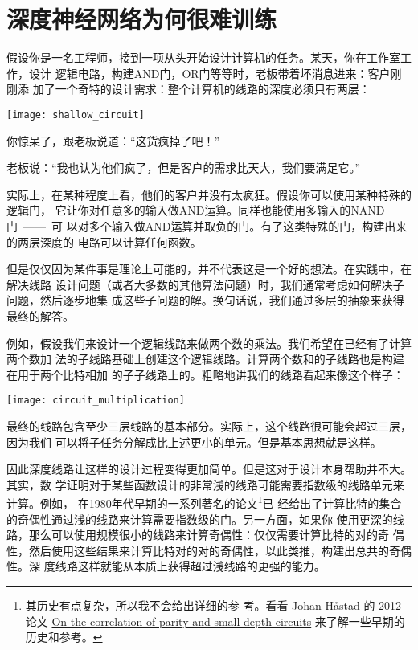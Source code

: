 
\chapter{深度神经网络为何很难训练}
\label{ch:WhyHardToTrain}

假设你是一名工程师，接到一项从头开始设计计算机的任务。某天，你在工作室工作，设计
逻辑电路，构建{\serif AND}门，{\serif OR}门等等时，老板带着坏消息进来：客户刚刚添
加了一个奇特的设计需求：整个计算机的线路的深度必须只有两层：
\begin{center}
  \texttt{[image: shallow\_circuit]}
\end{center}

你惊呆了，跟老板说道：“这货疯掉了吧！”
 
老板说：“我也认为他们疯了，但是客户的需求比天大，我们要满足它。”
 
实际上，在某种程度上看，他们的客户并没有太疯狂。假设你可以使用某种特殊的逻辑门，
它让你对任意多的输入做{\serif AND}运算。同样也能使用多输入的{\serif NAND}门~——~可
以对多个输入做{\serif AND}运算并取负的门。有了这类特殊的门，构建出来的两层深度的
电路可以计算任何函数。

但是仅仅因为某件事是理论上可能的，并不代表这是一个好的想法。在实践中，在解决线路
设计问题（或者大多数的其他算法问题）时，我们通常考虑如何解决子问题，然后逐步地集
成这些子问题的解。换句话说，我们通过多层的抽象来获得最终的解答。

例如，假设我们来设计一个逻辑线路来做两个数的乘法。我们希望在已经有了计算两个数加
法的子线路基础上创建这个逻辑线路。计算两个数和的子线路也是构建在用于两个比特相加
的子子线路上的。粗略地讲我们的线路看起来像这个样子：
\begin{center}
  \texttt{[image: circuit\_multiplication]}
\end{center}

最终的线路包含至少三层线路的基本部分。实际上，这个线路很可能会超过三层，因为我们
可以将子任务分解成比上述更小的单元。但是基本思想就是这样。
 
因此深度线路让这样的设计过程变得更加简单。但是这对于设计本身帮助并不大。其实，数
学证明对于某些函数设计的非常浅的线路可能需要指数级的线路单元来计算。例如，
在1980年代早期的一系列著名的论文\footnote{其历史有点复杂，所以我不会给出详细的参
  考。看看 Johan
  Håstad 的 2012 论文 \href{http://eccc.hpi-web.de/report/2012/137/}{On the
    correlation of parity and small-depth circuits} 来了解一些早期的历史和参考。}已
经给出了计算比特的集合的奇偶性通过浅的线路来计算需要指数级的门。另一方面，如果你
使用更深的线路，那么可以使用规模很小的线路来计算奇偶性：仅仅需要计算比特的对的奇
偶性，然后使用这些结果来计算比特对的对的奇偶性，以此类推，构建出总共的奇偶性。深
度线路这样就能从本质上获得超过浅线路的更强的能力。
 
